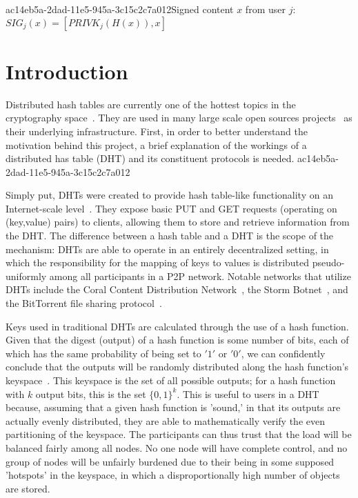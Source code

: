 \documentclass[12pt]{article}
\begin{document}
ac14eb5a-2dad-11e5-945a-3c15c2c7a012Signed content $x$ from user $j$: $SIG_j(x) = \left[ PRIVK_j( H(x) ), x \right]$

\section{Introduction}
\par Distributed hash tables are currently one of the hottest topics in the cryptography space~\cite{Stoica:2001dj,Rowstron:2001ea,Ratnasamy:2001wn}. They are used in many large scale open sources projects~\cite{Freitas:2013tb,Xu:2010vs,Perfitt:2010fh} as their underlying infrastructure. First, in order to better understand the motivation behind this project, a brief explanation of the workings of a distributed has table (DHT) and its constituent protocols is needed.
ac14eb5a-2dad-11e5-945a-3c15c2c7a012
\par Simply put, DHTs were created to provide hash table-like functionality on an Internet-scale level~\cite{Ratnasamy:2001wn}. They expose basic PUT and GET requests (operating on (key,value) pairs) to clients, allowing them to store and retrieve information from the DHT. The difference between a hash table and a DHT is the scope of the mechanism: DHTs are able to operate in an entirely decentralized setting, in which the responsibility for the mapping of keys to values is distributed pseudo-uniformly among all participants in a P2P network. Notable networks that utilize DHTs include the Coral Content Distribution Network~\cite{Freedman:2004vb}, the Storm Botnet~\cite{Holz:2008uk}, and the BitTorrent file sharing protocol~\cite{Cohen:y1_8mBnw}.

\par Keys used in traditional DHTs are calculated through the use of a hash function. Given that the digest (output) of a hash function is some number of bits, each of which has the same probability of being set to $'1'$ or $'0'$, we can confidently conclude that the outputs will be randomly distributed along the hash function's keyspace~. This keyspace is the set of all possible outputs; for a hash function with $k$ output bits, this is the set $\{0,1\}^k$. This is useful to users in a DHT because, assuming that a given hash function is 'sound,' in that its outputs are actually evenly distributed, they are able to mathematically verify the even partitioning of the keyspace. The participants can thus trust that the load will be balanced fairly among all nodes. No one node will have complete control, and no group of nodes will be unfairly burdened due to their being in some supposed 'hotspots' in the keyspace, in which a disproportionally high number of objects are stored.~
\end{document}
